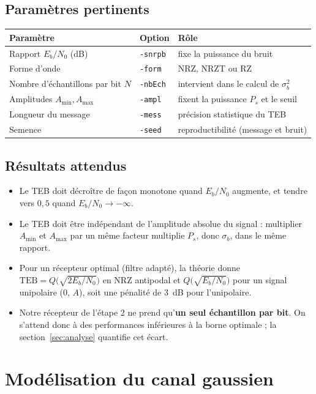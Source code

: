 \documentclass[11pt,a4paper]{article}
\newcommand{\EbNo}{E_b/N_0}
\begin{document}
\subsection{Paramètres pertinents}
\begin{center}\begin{tabular}{lll}\toprule
Paramètre & Option & Rôle\\\midrule
Rapport $\EbNo$ (dB) & \texttt{-snrpb} & fixe la puissance du bruit\\
Forme d'onde & \texttt{-form} & NRZ, NRZT ou RZ\\
Nombre d'échantillons par bit $N$ & \texttt{-nbEch} & intervient dans le calcul de $\sigma_b^2$\\
Amplitudes $A_{\min}, A_{\max}$ & \texttt{-ampl} & fixent la puissance $P_s$ et le seuil\\
Longueur du message & \texttt{-mess} & précision statistique du TEB\\
Semence & \texttt{-seed} & reproductibilité (message et bruit)\\\bottomrule
\end{tabular}\end{center}

\subsection{Résultats attendus}
\begin{itemize}
  \item Le TEB doit décroître de façon monotone quand $\EbNo$ augmente, et tendre vers $0{,}5$ quand $\EbNo\to-\infty$.
  \item Le TEB doit être indépendant de l'amplitude absolue du signal : multiplier $A_{\min}$ et $A_{\max}$ par un même facteur multiplie $P_s$, donc $\sigma_b$, dans le même rapport.
  \item Pour un récepteur optimal (filtre adapté), la théorie donne $\text{TEB} = Q\big(\sqrt{2\EbNo}\big)$ en NRZ antipodal et $Q\big(\sqrt{\EbNo}\big)$ pour un signal unipolaire (0, $A$), soit une pénalité de 3~dB pour l'unipolaire.
  \item Notre récepteur de l'étape 2 ne prend qu'\textbf{un seul échantillon par bit}. On s'attend donc à des performances inférieures à la borne optimale ; la section~\ref{sec:analyse} quantifie cet écart.
\end{itemize}

\section{Modélisation du canal gaussien}
\end{document}
